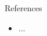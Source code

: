
\begin{frame}{}{\mylogo}\vspace{-1em}
References
\footnotesize
\begin{itemize}
	\item ...
\end{itemize}

\end{frame}
